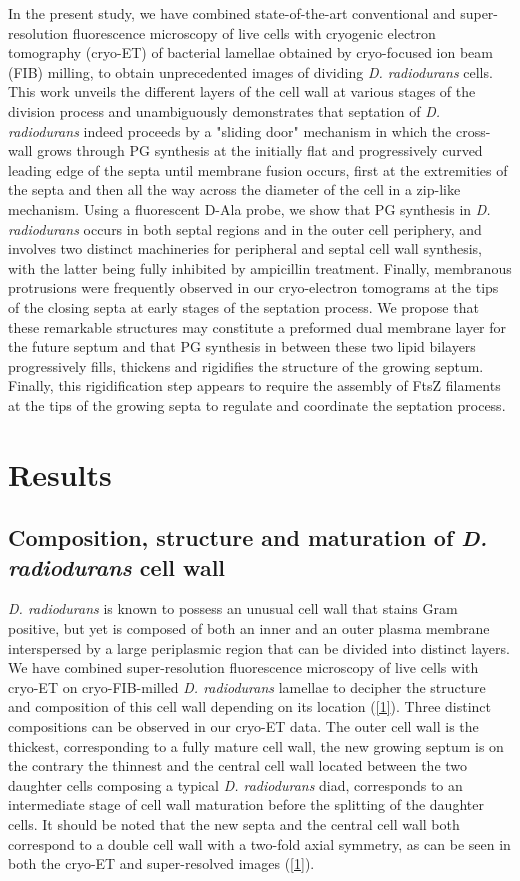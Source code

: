In the present study, we have combined state-of-the-art conventional and super-resolution fluorescence microscopy of live cells with cryogenic electron tomography (cryo-ET) of bacterial lamellae obtained by cryo-focused ion beam (FIB) milling, to obtain unprecedented images of dividing \textit{D. radiodurans} cells.
This work unveils the different layers of the cell wall at various stages of the division process and unambiguously demonstrates that septation of \textit{D. radiodurans} indeed proceeds by a "sliding door" mechanism in which the cross-wall grows through PG synthesis at the initially flat and progressively curved leading edge of the septa until membrane fusion occurs, first at the extremities of the septa and then all the way across the diameter of the cell in a zip-like mechanism.
Using a fluorescent D-Ala probe, we show that PG synthesis in \textit{D. radiodurans} occurs in both septal regions and in the outer cell periphery, and involves two distinct machineries for peripheral and septal cell wall synthesis, with the latter being fully inhibited by ampicillin treatment.
Finally, membranous protrusions were frequently observed in our cryo-electron tomograms at the tips of the closing septa at early stages of the septation process.
We propose that these remarkable structures may constitute a preformed dual membrane layer for the future septum and that PG synthesis in between these two lipid bilayers progressively fills, thickens and rigidifies the structure of the growing septum.
Finally, this rigidification step appears to require the assembly of FtsZ filaments at the tips of the growing septa to regulate and coordinate the septation process.

\section{Results}

\subsection{Composition, structure and maturation of \textit{D. radiodurans} cell wall}

\textit{D. radiodurans} is known to possess an unusual cell wall that stains Gram positive, but yet is composed of both an inner and an outer plasma membrane interspersed by a large periplasmic region that can be divided into distinct layers.
We have combined super-resolution fluorescence microscopy of live cells with cryo-ET on cryo-FIB-milled \textit{D. radiodurans} lamellae to decipher the structure and composition of this cell wall depending on its location (\autoref{1}).
Three distinct compositions can be observed in our cryo-ET data.
The outer cell wall is the thickest, corresponding to a fully mature cell wall, the new growing septum is on the contrary the thinnest and the central cell wall located between the two daughter cells composing a typical \textit{D. radiodurans} diad, corresponds to an intermediate stage of cell wall maturation before the splitting of the daughter cells.
It should be noted that the new septa and the central cell wall both correspond to a double cell wall with a two-fold axial symmetry, as can be seen in both the cryo-ET and super-resolved images (\autoref{1}).

